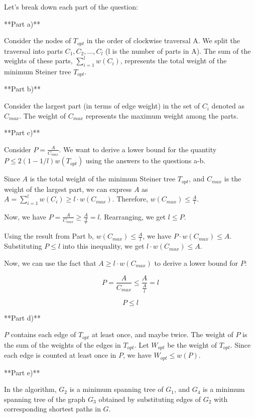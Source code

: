 Let's break down each part of the question:

**Part a)**

Consider the nodes of \(T_{opt}\) in the order of clockwise traversal A. We split the traversal into parts \(C_1, C_2, ..., C_l\) (l is the number of parts in A). The sum of the weights of these parts, \(\sum^{l}_{i=1} w(C_i)\), represents the total weight of the minimum Steiner tree \(T_{opt}\).

**Part b)**

Consider the largest part (in terms of edge weight) in the set of \(C_i\) denoted as \(C_{max}\). The weight of \(C_{max}\) represents the maximum weight among the parts.

**Part c)**

Consider \(P = \frac{A}{C_{max}}\). We want to derive a lower bound for the quantity \(P \leq 2(1 - 1/l) w(T_{opt})\) using the answers to the questions a-b.

Since \(A\) is the total weight of the minimum Steiner tree \(T_{opt}\), and \(C_{max}\) is the weight of the largest part, we can express \(A\) as \(A = \sum^{l}_{i=1} w(C_i) \geq l \cdot w(C_{max})\). Therefore, \(w(C_{max}) \leq \frac{A}{l}\).

Now, we have \(P = \frac{A}{C_{max}} \geq \frac{A}{\frac{A}{l}} = l\). Rearranging, we get \(l \leq P\).

Using the result from Part b, \(w(C_{max}) \leq \frac{A}{l}\), we have \(P \cdot w(C_{max}) \leq A\). Substituting \(P \leq l\) into this inequality, we get \(l \cdot w(C_{max}) \leq A\).

Now, we can use the fact that \(A \geq l \cdot w(C_{max})\) to derive a lower bound for \(P\):

\[P = \frac{A}{C_{max}} \leq \frac{A}{\frac{A}{l}} = l\]

\[P \leq l\]

**Part d)**

\(P\) contains each edge of \(T_{opt}\) at least once, and maybe twice. The weight of \(P\) is the sum of the weights of the edges in \(T_{opt}\). Let \(W_{opt}\) be the weight of \(T_{opt}\). Since each edge is counted at least once in \(P\), we have \(W_{opt} \leq w(P)\).

**Part e)**

In the algorithm, \(G_2\) is a minimum spanning tree of \(G_1\), and \(G_4\) is a minimum spanning tree of the graph \(G_3\) obtained by substituting edges of \(G_2\) with corresponding shortest paths in \(G\). 

